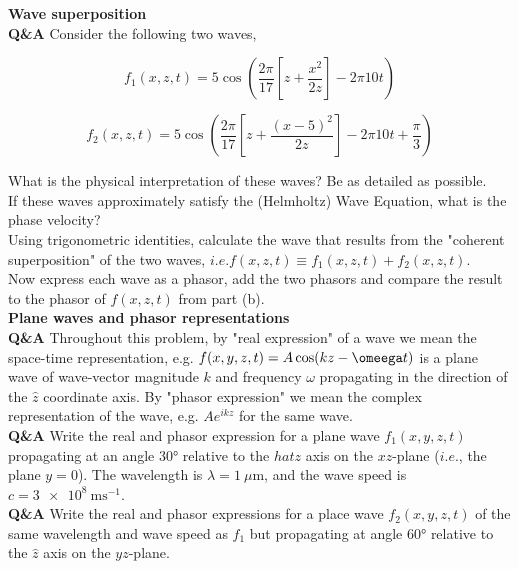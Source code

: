\documentclass[main.tex]{subfiles}
\begin{document}
\textbf{Wave superposition}\\
\textbf{Q\&A} Consider the following two waves,

\begin{equation}\label{eq:ws_1}
f_1(x,z,t) = 5\cos \left(\frac{2 \pi}{17} \left[ z+\frac{x^2}{2z} \right] -2\pi 10t \right)
\end{equation}

\begin{equation}\label{eq:ws_2}
f_2(x,z,t) = 5\cos \left(\frac{2 \pi}{17} \left[ z+\frac{(x-5)^2}{2z} \right] -2\pi 10t + \frac{\pi}{3} \right)
\end{equation}

What is the physical interpretation of these waves? Be as detailed as possible.\\

If these waves approximately satisfy the (Helmholtz) Wave Equation, what is the phase velocity?\\

Using trigonometric identities, calculate the wave that results from the "coherent superposition" of the two waves, $i.e. f(x,z,t) \equiv f_1(x,z,t) + f_2(x,z,t)$.\\

Now express each wave as a phasor, add the two phasors and compare the result to the phasor of $f(x,z,t)$ from part (b).\\

\textbf{Plane waves and phasor representations}\\
\textbf{Q\&A} Throughout this problem, by "real expression" of a wave we mean the space-time representation, e.g. $f(x,y,z,t) = A\cos(kz-\omeega t)$ is a plane wave of wave-vector magnitude $k$ and frequency $\omega$ propagating in the direction of the $\hat{z}$ coordinate axis. By "phasor expression" we mean the complex representation of the wave, e.g. $Ae^{ikz}$ for the same wave.\\

\textbf{Q\&A} Write the real and phasor expression for a plane wave $f_1(x,y,z,t)$ propagating at an angle $\ang{30}$ relative to the $hat{z}$ axis on the $xz$-plane ($i.e.$, the plane $y=0$). The wavelength is $\lambda = \SI{1}{\mu \meter}$, and the wave speed is $c = \SI{3e8}{\metre \second^{-1}}$.\\

\textbf{Q\&A} Write the real and phasor expressions for a place wave $f_2(x,y,z,t)$ of the same wavelength and wave speed as $f_1$ but propagating at angle $\ang{60}$ relative to the $\hat{z}$ axis on the $yz$-plane.
\end{document}
